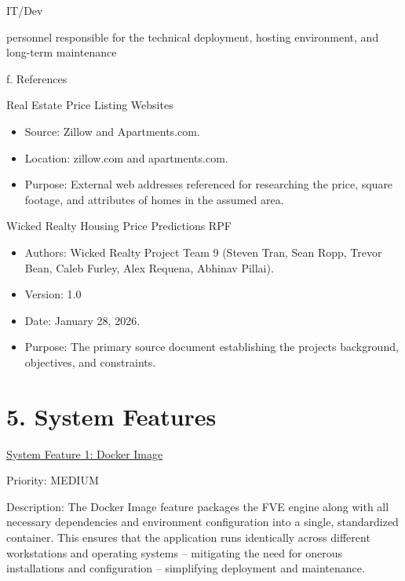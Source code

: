 \documentclass[
]{article}
\begin{document}
IT/Dev

personnel responsible for the technical deployment, hosting environment,
and long-term maintenance

f. References

Real Estate Price Listing Websites

\begin{itemize}
\item
  Source: Zillow and Apartments.com.
\end{itemize}

\begin{itemize}
\item
  Location: zillow.com and apartments.com.
\end{itemize}

\begin{itemize}
\item
  Purpose: External web addresses referenced for researching the price,
  square footage, and attributes of homes in the assumed area.
\end{itemize}

Wicked Realty Housing Price Predictions RPF

\begin{itemize}
\item
  Authors: Wicked Realty Project Team 9 (Steven Tran, Sean Ropp, Trevor
  Bean, Caleb Furley, Alex Requena, Abhinav Pillai).
\item
  Version: 1.0
\item
  Date: January 28, 2026.
\item
  Purpose: The primary source document establishing the
  project\textquotesingle s background, objectives, and constraints.
\end{itemize}

\hypertarget{system-features}{%
\section{5. System Features}\label{system-features}}

\ul{System Feature 1: Docker Image}

Priority: MEDIUM

Description: The Docker Image feature packages the FVE engine along with
all necessary dependencies and environment configuration into a single,
standardized container. This ensures that the application runs
identically across different workstations and operating systems --
mitigating the need for onerous installations and configuration --
simplifying deployment and maintenance.
\end{document}
